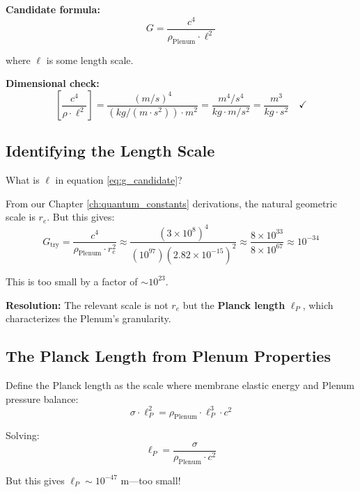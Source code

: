 \textbf{Candidate formula:}
\begin{equation}
G = \frac{c^4}{\rho_{\text{Plenum}} \cdot \ell^2}
\label{eq:g_candidate}
\end{equation}

where $\ell$ is some length scale.

\textbf{Dimensional check:}
\begin{equation}
\left[\frac{c^4}{\rho \cdot \ell^2}\right] = \frac{(m/s)^4}{(kg/(m \cdot s^2)) \cdot m^2} = \frac{m^4/s^4}{kg \cdot m/s^2} = \frac{m^3}{kg \cdot s^2} \quad \checkmark
\end{equation}

\subsection{Identifying the Length Scale}

What is $\ell$ in equation \eqref{eq:g_candidate}?

From our Chapter \ref{ch:quantum_constants} derivations, the natural geometric scale is $r_e$. But this gives:
\begin{equation}
G_{\text{try}} = \frac{c^4}{\rho_{\text{Plenum}} \cdot r_e^2} \approx \frac{(3 \times 10^8)^4}{(10^{97})(2.82 \times 10^{-15})^2} \approx \frac{8 \times 10^{33}}{8 \times 10^{67}} \approx 10^{-34}
\end{equation}

This is too small by a factor of $\sim 10^{23}$.

\textbf{Resolution:} The relevant scale is not $r_e$ but the \textbf{Planck length} $\ell_P$, which characterizes the Plenum's granularity.

\subsection{The Planck Length from Plenum Properties}

Define the Planck length as the scale where membrane elastic energy and Plenum pressure balance:
\begin{equation}
\sigma \cdot \ell_P^2 = \rho_{\text{Plenum}} \cdot \ell_P^3 \cdot c^2
\end{equation}

Solving:
\begin{equation}
\ell_P = \frac{\sigma}{\rho_{\text{Plenum}} \cdot c^2}
\end{equation}

But this gives $\ell_P \sim 10^{-47}$ m—too small!

